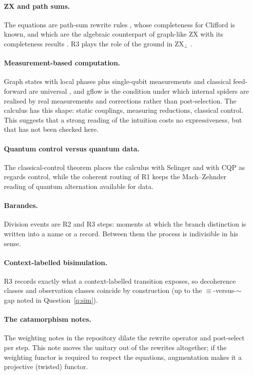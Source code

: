 \documentclass[11pt,a4paper]{article}
\theoremstyle{plain}
\theoremstyle{definition}
\theoremstyle{remark}
\newcommand{\scong}{\equiv}
\begin{document}
\paragraph{ZX and path sums.} The equations are path-sum rewrite rules
\cite{Dawson,Amy}, whose completeness for Clifford is known, and which are the
algebraic counterpart of graph-like ZX \cite{DKPW} with its completeness
results \cite{JPV,Vilmart}. R3 plays the role of the ground in ZX$_\perp$
\cite{CJPV}.

\paragraph{Measurement-based computation.} Graph states with local phases plus
single-qubit measurements and classical feed-forward are universal
\cite{RB}, and gflow \cite{BKMP} is the condition under which internal spiders
are realised by real measurements and corrections rather than post-selection.
The calculus has this shape: static couplings, measuring reductions, classical
control. This suggests that a strong reading of the intuition costs no
expressiveness, but that has not been checked here.

\paragraph{Quantum control versus quantum data.} The classical-control theorem
places the calculus with Selinger \cite{Selinger} and with CQP \cite{CQP} as
regards control, while the coherent routing of R1 keeps the Mach--Zehnder
reading of quantum alternation \cite{BP,YYF} available for data.

\paragraph{Barandes.} Division events \cite{Barandes} are R2 and R3 steps:
moments at which the branch distinction is written into a name or a record.
Between them the process is indivisible in his sense.

\paragraph{Context-labelled bisimulation.} R3 records exactly what a
context-labelled transition exposes, so decoherence classes and observation
classes coincide by construction (up to the $\scong$-versus-$\sim$ gap noted in
Question~\ref{q:sim}).

\paragraph{The catamorphism notes.} The weighting notes in the repository
dilate the rewrite operator and post-select per step. This note moves the
unitary out of the rewrites altogether; if the weighting functor is required to
respect the equations, augmentation makes it a projective (twisted) functor.
\end{document}
